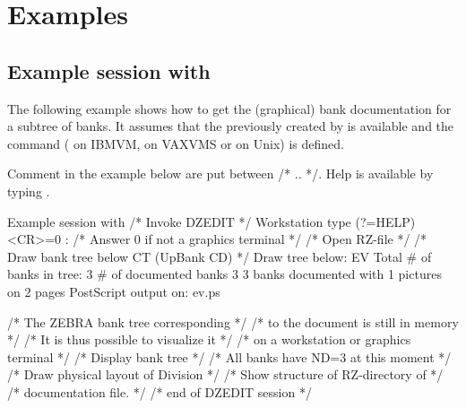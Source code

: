 \section{Examples}
\label{sec:dzdocexamples} 
 
\subsection[Example session with {\tt DZEDIT}]{Example session with }
 
The following example shows how to get the (graphical) bank
documentation for a subtree of banks. 
It assumes that the \RZfile{} previously created by  
is available and the command 
 ( on IBMVM, 
 on VAXVMS or  on Unix) is defined. 
 
Comment in the example below are put between /* .. */.
Help is available by typing .
 
\begin{XMPt}{Example session with }
                                         /* Invoke DZEDIT                         */
Workstation type (?=HELP) <CR>=0 :             /* Answer 0 if not a graphics terminal   */
                             /* Open RZ-file                          */
                                /* Draw bank tree below CT (UpBank CD)   */
   Draw tree below: EV                         
   Total # of banks in tree:       3       
   # of documented banks           3       
 3 banks documented with  1 pictures on  2 pages
 PostScript output on: ev.ps                  
 
                                               /* The ZEBRA bank tree corresponding     */
                                               /* to the document is still in memory    */
                                               /* It is thus possible to visualize it   */
                                               /* on a workstation or graphics terminal */
                                         /* Display bank tree                     */
                                               /* All banks have ND=3 at this moment    */
                                         /* Draw physical layout of Division      */
                                         /* Show structure of RZ-directory of     */
                                               /* documentation file.                   */
                                           /* end of DZEDIT session                 */
\end{XMPt}
 
